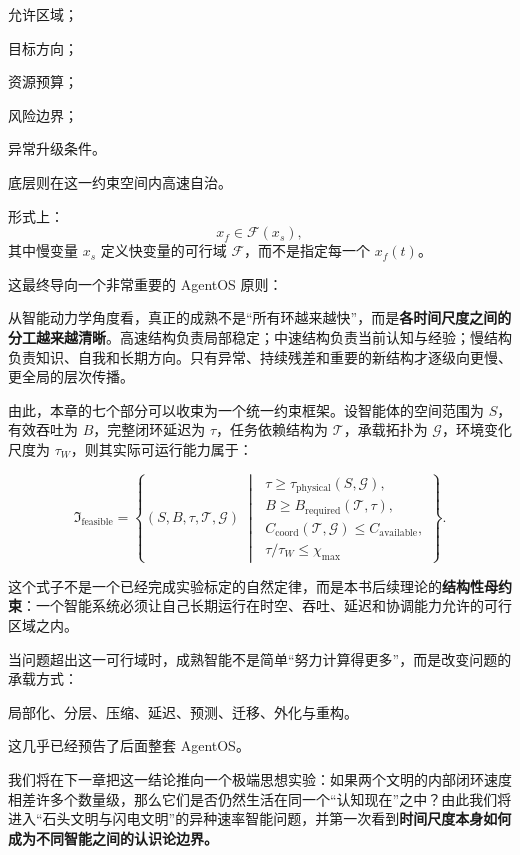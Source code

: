 允许区域；

目标方向；

资源预算；

风险边界；

异常升级条件。

底层则在这一约束空间内高速自治。

形式上：
\[
x_f
\in
\mathcal F(x_s),
\]
其中慢变量 $x_s$ 定义快变量的可行域 $\mathcal F$，而不是指定每一个 $x_f(t)$。

这最终导向一个非常重要的 AgentOS 原则：
\begin{statementbox}
\centering
{}
\end{statementbox}

从智能动力学角度看，真正的成熟不是“所有环越来越快”，而是\textbf{各时间尺度之间的分工越来越清晰}。高速结构负责局部稳定；中速结构负责当前认知与经验；慢结构负责知识、自我和长期方向。只有异常、持续残差和重要的新结构才逐级向更慢、更全局的层次传播。

由此，本章的七个部分可以收束为一个统一约束框架。设智能体的空间范围为 $S$，有效吞吐为 $B$，完整闭环延迟为 $\tau$，任务依赖结构为 $\mathcal T$，承载拓扑为 $\mathcal G$，环境变化尺度为 $\tau_W$，则其实际可运行能力属于：

\[
\boxed{
\mathfrak I_{\mathrm{feasible}}
=
\left\{
(S,B,\tau,\mathcal T,\mathcal G)
\;\middle|\;
\begin{array}{l}
\tau
\geq
\tau_{\mathrm{physical}}(S,\mathcal G),
\\[0.2cm]
B
\geq
B_{\mathrm{required}}(\mathcal T,\tau),
\\[0.2cm]
C_{\mathrm{coord}}
(\mathcal T,\mathcal G)
\leq
C_{\mathrm{available}},
\\[0.2cm]
\tau/\tau_W
\leq
\chi_{\max}
\end{array}
\right\}.
}
\]

这个式子不是一个已经完成实验标定的自然定律，而是本书后续理论的\textbf{结构性母约束}：一个智能系统必须让自己长期运行在时空、吞吐、延迟和协调能力允许的可行区域之内。

当问题超出这一可行域时，成熟智能不是简单“努力计算得更多”，而是改变问题的承载方式：

\begin{statementbox}
局部化、分层、压缩、延迟、预测、迁移、外化与重构。
\end{statementbox}

这几乎已经预告了后面整套 AgentOS。

我们将在下一章把这一结论推向一个极端思想实验：如果两个文明的内部闭环速度相差许多个数量级，那么它们是否仍然生活在同一个“认知现在”之中？由此我们将进入“石头文明与闪电文明”的异种速率智能问题，并第一次看到\textbf{时间尺度本身如何成为不同智能之间的认识论边界。}
